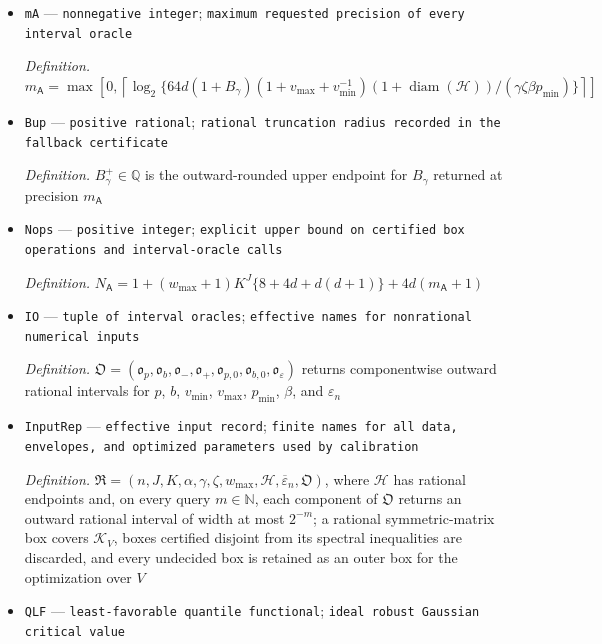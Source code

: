 \documentclass{article}
\begin{document}
\begin{itemize}
  \item \texttt{mA} --- \texttt{nonnegative integer}; \texttt{maximum requested precision of every interval oracle}
  \par\smallskip\noindent\emph{Definition.} \(m_{\mathsf A}=\max\left[0,\left\lceil\log_2\{64d(1+B_\gamma)(1+v_{\max}+v_{\min}^{-1})(1+\operatorname{diam}(\mathcal H))/(\gamma\zeta\beta p_{\min})\}\right\rceil\right]\)
  \item \texttt{Bup} --- \texttt{positive rational}; \texttt{rational truncation radius recorded in the fallback certificate}
  \par\smallskip\noindent\emph{Definition.} \(B_\gamma^+\in\mathbb Q\) is the outward-rounded upper endpoint for \(B_\gamma\) returned at precision \(m_{\mathsf A}\)
  \item \texttt{Nops} --- \texttt{positive integer}; \texttt{explicit upper bound on certified box operations and interval-\allowbreak{}oracle calls}
  \par\smallskip\noindent\emph{Definition.} \(N_{\mathsf A}=1+(w_{\max}+1)K^J\{8+4d+d(d+1)\}+4d(m_{\mathsf A}+1)\)
  \item \texttt{IO} --- \texttt{tuple of interval oracles}; \texttt{effective names for nonrational numerical inputs}
  \par\smallskip\noindent\emph{Definition.} \(\mathfrak O=(\mathfrak o_p,\mathfrak o_b,\mathfrak o_-,\mathfrak o_+,\mathfrak o_{p,0},\mathfrak o_{b,0},\mathfrak o_\varepsilon)\) returns componentwise outward rational intervals for \(p\), \(b\), \(v_{\min}\), \(v_{\max}\), \(p_{\min}\), \(\beta\), and \(\varepsilon_n\)
  \item \texttt{InputRep} --- \texttt{effective input record}; \texttt{finite names for all data,\allowbreak{} envelopes,\allowbreak{} and optimized parameters used by calibration}
  \par\smallskip\noindent\emph{Definition.} \(\mathfrak R=(n,J,K,\alpha,\gamma,\zeta,w_{\max},\mathcal H,\overline\varepsilon_n,\mathfrak O)\), where \(\mathcal H\) has rational endpoints and, on every query \(m\in\mathbb N\), each component of \(\mathfrak O\) returns an outward rational interval of width at most \(2^{-m}\); a rational symmetric-matrix box covers \(\mathcal K_V\), boxes certified disjoint from its spectral inequalities are discarded, and every undecided box is retained as an outer box for the optimization over \(V\)
  \item \texttt{QLF} --- \texttt{least-\allowbreak{}favorable quantile functional}; \texttt{ideal robust Gaussian critical value}

\end{itemize}
\end{document}
